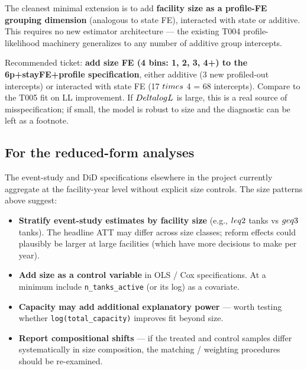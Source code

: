 \documentclass[
  11pt,
]{article}
\providecommand{\tightlist}{%
  \setlength{\itemsep}{0pt}\setlength{\parskip}{0pt}}\usepackage{longtable,booktabs,array}
\begin{document}
The cleanest minimal extension is to add \textbf{facility size as a
profile-FE grouping dimension} (analogous to state FE), interacted with
state or additive. This requires no new estimator architecture --- the
existing T004 profile-likelihood machinery generalizes to any number of
additive group intercepts.

Recommended ticket: \textbf{add size FE (4 bins: 1, 2, 3, 4+) to the
6p+stayFE+profile specification}, either additive (3 new profiled-out
intercepts) or interacted with state FE (17 \(\\times\) 4 = 68
intercepts). Compare to the T005 fit on LL improvement. If
\(\\Delta\\log L\) is large, this is a real source of misspecification;
if small, the model is robust to size and the diagnostic can be left as
a footnote.

\subsection{For the reduced-form
analyses}\label{for-the-reduced-form-analyses}

The event-study and DiD specifications elsewhere in the project
currently aggregate at the facility-year level without explicit size
controls. The size patterns above suggest:

\begin{itemize}
\tightlist
\item
  \textbf{Stratify event-study estimates by facility size} (e.g.,
  \(\\leq 2\) tanks vs \(\\geq 3\) tanks). The headline ATT may differ
  across size classes; reform effects could plausibly be larger at large
  facilities (which have more decisions to make per year).
\item
  \textbf{Add size as a control variable} in OLS / Cox specifications.
  At a minimum include \texttt{n\_tanks\_active} (or its log) as a
  covariate.
\item
  \textbf{Capacity may add additional explanatory power} --- worth
  testing whether \texttt{log(total\_capacity)} improves fit beyond
  size.
\item
  \textbf{Report compositional shifts} --- if the treated and control
  samples differ systematically in size composition, the matching /
  weighting procedures should be re-examined.
\end{itemize}
\end{document}

